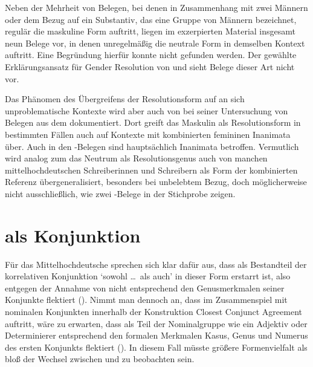 Neben der Mehrheit von Belegen, bei denen in Zusammenhang mit zwei Männern oder
dem Bezug auf ein Substantiv, das eine Gruppe von Männern bezeichnet, regulär
die maskuline Form  auftritt, liegen im exzerpierten Material
insgesamt neun Belege vor, in denen unregelmäßig die neutrale Form
 in demselben Kontext auftritt. Eine Begründung hierfür konnte
nicht gefunden werden. Der gewählte Erklärungsansatz für Gender Resolution von
\citet{wechslerzlatic2003} und \citet{wechsler2009} sieht Belege dieser Art
nicht vor.

Das Phänomen des Übergreifens der Resolutionsform auf an sich unproblematische
Kontexte wird aber auch von \citet[302]{corbett1991} bei seiner Untersuchung
von Belegen aus dem  dokumentiert. Dort greift das Maskulin als
Resolutionsform in bestimmten Fällen auch auf Kon\-texte mit kombinierten
femininen Inanimata über. Auch in den \CAO{}-Belegen sind hauptsächlich
Inanimata betroffen. Vermutlich wird analog zum  das Neutrum als
Resolutionsgenus auch von manchen mittelhochdeutschen
Schreiberinnen und Schreibern als Form der kombinierten Referenz
übergeneralisiert, besonders bei unbelebtem Bezug, doch möglicherweise nicht
ausschließlich, wie zwei \KC-Belege in der Stichprobe zeigen.


\section{ als Konjunktion}
\label{sec:beideconj}

Für das Mittelhochdeutsche sprechen sich
\citet[626--627]{ksw2} klar dafür aus, dass  als Bestandteil der
korrelativen Konjunktion  `sowohl \dots\ als auch' in
dieser Form erstarrt ist, also  entgegen der Annahme von
\citet{askedal1974} nicht entsprechend den Genusmerkmalen seiner Konjunkte
flektiert (). Nimmt man dennoch an, dass im
Zusammenspiel mit nominalen Konjunkten innerhalb der Konstruktion Closest
Conjunct Agreement auftritt, wäre zu erwarten,
dass  als Teil der Nominalgruppe wie ein Adjektiv oder
Determinierer entsprechend den formalen Merkmalen Kasus, Genus und Numerus des
ersten Konjunkts flektiert (). In diesem Fall müsste
größere Formenvielfalt als bloß der Wechsel zwischen  und
 zu beobachten sein.

